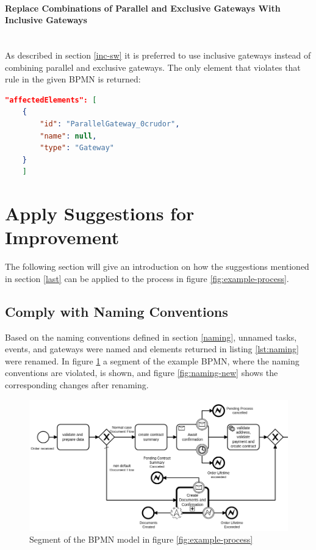 \paragraph{Replace Combinations of Parallel and Exclusive Gateways With Inclusive Gateways}~\\
As described in section \ref{inc-sw} it is preferred to use inclusive gateways instead of combining parallel and exclusive gateways. The only element that violates that rule in the given BPMN is returned:
\begin{lstlisting}[language=json]
	"affectedElements": [
	{
		"id": "ParallelGateway_0crudor",
		"name": null,
		"type": "Gateway"
	}
	]
\end{lstlisting}
\section{Apply Suggestions for Improvement}\label{improvements}
The following section will give an introduction on how the suggestions mentioned in section \ref{last} can be applied to the process in figure \ref{fig:example-process}. 
\subsection{Comply with Naming Conventions}
Based on the naming conventions defined in section \ref{naming}, unnamed tasks, events, and gateways were named and elements returned in listing \ref{lst:naming} were renamed. In figure \ref{fig:naming-org} a segment of the example BPMN, where the naming conventions are violated, is shown, and figure \ref{fig:naming-new} shows the corresponding changes after renaming. 

\begin{figure}[H]
	\centering
	\includegraphics[width=0.9\columnwidth]{graphics/case-study-naming-org}
	\caption{Segment of the BPMN model in figure \ref{fig:example-process}}
	\label{fig:naming-org}
\end{figure}

